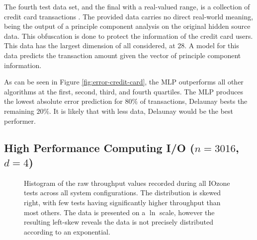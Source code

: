 \documentclass[smallextended,final]{svjour3}  %
\begin{document}
The fourth test data set, and the final with a real-valued range, is a
collection of credit card transactions
\cite{pozzolo2015calibrating}. The provided data carries no direct
real-world meaning, being the output of a principle component analysis
on the original hidden source data. This obfuscation is done to
protect the information of the credit card users. This data has the
largest dimension of all considered, at 28. A model for this data
predicts the transaction amount given the vector of principle
component information.

As can be seen in Figure \ref{fig:error-credit-card}, the MLP
outperforms all other algorithms at the first, second, third, and
fourth quartiles. The MLP produces the lowest absolute error
prediction for $80\%$ of transactions, Delaunay bests the remaining
$20\%$. It is likely that with less data, Delaunay would be the best
performer.


\subsection{High Performance Computing I/O ($n = 3016$, $d = 4$)}

\begin{figure}
  \centering
  \caption{Histogram of the raw throughput values recorded during all
    IOzone tests across all system configurations. The distribution is
    skewed right, with few tests having significantly higher
    throughput than most others. The data is presented on a $\ln$
    scale, however the resulting left-skew reveals the data is not
    precisely distributed according to an exponential.}
  \label{fig:hist-throughput}
\end{figure}
\end{document}
